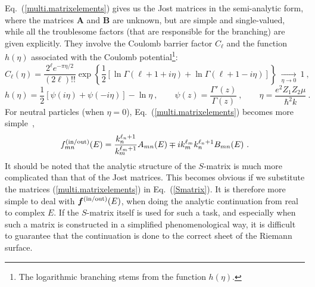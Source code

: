 \documentclass[12pt]{article}
\begin{document}
Eq.~(\ref{multi.matrixelements}) gives us the Jost matrices in the
semi-analytic form, where the matrices $\bm{A}$ and $\bm{B}$ are unknown, but
are simple
and single-valued, while all the troublesome factors (that are responsible for
the branching) are given explicitly. They involve the Coulomb barrier
factor $C_\ell$ and the function $h(\eta)$ associated with the Coulomb
potential\footnote{The logarithmic branching stems from the function
$h(\eta)$.}:
\begin{equation}
\label{CL}
  C_\ell(\eta)=
  \frac{2^\ell e^{-\pi\eta/2}}{(2\ell)!!}
  \exp\left\{\frac12\left[\ln\Gamma(\ell+1+i\eta)+
  \ln\Gamma(\ell+1-i\eta)\right]\right\}
  \ \mathop{\longrightarrow}\limits_{\eta\to0}\ 1\ ,
\end{equation}
\begin{equation}
\label{h_function}
   h(\eta)=\frac12\left[\psi(i\eta)+
   \psi(-i\eta)\right]-\ln{\eta}\ ,
   \qquad
   \psi(z)=\frac{\Gamma'(z)}{\Gamma(z)}\ ,
   \qquad
   {\eta}=\frac{e^2Z_1Z_2\mu}{\hbar^2k}\ .
\end{equation}
For neutral particles (when $\eta=0$), Eq.~(\ref{multi.matrixelements}) becomes
more simple~\cite{our.MultiCh},
\begin{equation}
\label{multichannel.JostMatr.Jostfact}
   f_{mn}^{\rm(in/out)}(E)=
   \frac{k_n^{\ell_n+1}}{k_m^{\ell_m+1}}{A}_{mn}(E)\mp
   ik_m^{\ell_m}k_n^{\ell_n+1}{B}_{mn}(E)\ .
\end{equation}
It should be noted that the analytic structure of the $S$-matrix is much more
complicated than that of the Jost matrices. This becomes obvious if we
substitute the matrices (\ref{multi.matrixelements}) in Eq.~(\ref{Smatrix}). It
is therefore more simple to deal with $\bm{f}^{\rm(in/out)}(E)$, when doing the
analytic continuation from real to complex $E$. If the $S$-matrix itself is
used for such a task, and especially when such a matrix is constructed in a
simplified phenomenological way, it is difficult to guarantee that the
continuation is done to the correct sheet of the Riemann surface.

\end{document}
